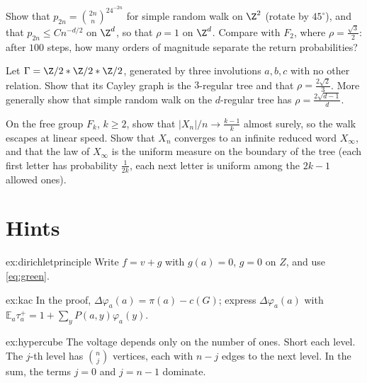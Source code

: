 \begin{exercise}[$\star\star$]\label{ex:znreturn}
Show that $p_{2n}=\binom{2n}n^24^{-2n}$ for simple random walk on $\Z^2$ (rotate by $45^\circ$), and that $p_{2n}\le Cn^{-d/2}$ on $\Z^d$, so that $\rho=1$ on $\Z^d$. Compare with $F_2$, where $\rho=\frac{\sqrt3}2$: after $100$ steps,
how many orders of magnitude separate the return probabilities?
\end{exercise}

\begin{exercise}[$\star\star$]\label{ex:regulartree}
Let $\Gamma=\Z/2*\Z/2*\Z/2$, generated by three involutions $a,b,c$ with no other relation. Show that its Cayley graph is the $3$-regular tree and that $\rho=\frac{2\sqrt2}3$. More generally show that simple random walk on the
$d$-regular tree has $\rho=\frac{2\sqrt{d-1}}d$.
\end{exercise}

\begin{exercise}[$\star\star\star$]\label{ex:speed}
On the free group $F_k$, $k\ge2$, show that $|X_n|/n\to\frac{k-1}k$ almost surely, so the walk escapes at linear speed. Show that $X_n$ converges to an infinite reduced word $X_\infty$, and that the law of $X_\infty$ is the
uniform measure on the boundary of the tree (each first letter has probability $\frac1{2k}$, each next letter is uniform among the $2k-1$ allowed ones).
\end{exercise}

\section{Hints}

\begin{hint}{ex:dirichletprinciple}
Write $f=v+g$ with $g(a)=0$, $g=0$ on $Z$, and use \eqref{eq:green}.
\end{hint}

\begin{hint}{ex:kac}
In the proof, $\Delta\varphi_a(a)=\pi(a)-c(G)$; express $\Delta\varphi_a(a)$ with $\mathbb E_a\tau_a^+=1+\sum_yP(a,y)\varphi_a(y)$.
\end{hint}

\begin{hint}{ex:hypercube}
The voltage depends only on the number of ones. Short each level. The $j$-th level has $\binom nj$ vertices, each with $n-j$ edges to the next level. In the sum, the terms $j=0$ and $j=n-1$ dominate.
\end{hint}

